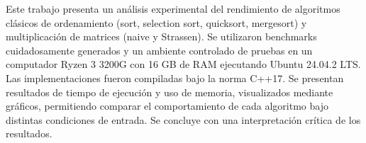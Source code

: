Este trabajo presenta un análisis experimental del rendimiento de algoritmos clásicos de ordenamiento (sort, selection sort, quicksort, mergesort) 
y multiplicación de matrices (naive y Strassen). Se utilizaron benchmarks cuidadosamente generados y un ambiente controlado de pruebas en un computador 
Ryzen 3 3200G con 16 GB de RAM ejecutando Ubuntu 24.04.2 LTS. Las implementaciones fueron compiladas bajo la norma C++17. Se presentan resultados de tiempo de ejecución 
y uso de memoria, visualizados mediante gráficos, permitiendo comparar el 
comportamiento de cada algoritmo bajo distintas condiciones de entrada. Se concluye con una interpretación crítica de los resultados.